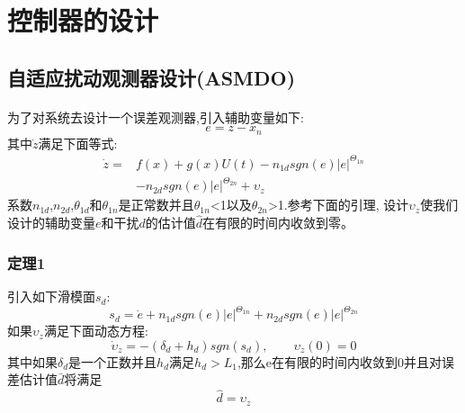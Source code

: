 \documentclass{cjc}
\begin{document}
\section{控制器的设计}

\subsection{自适应扰动观测器设计(ASMDO)}
  \paragraph{}为了对系统去设计一个误差观测器,引入辅助变量如下:
  \begin{equation}
    e = z - x_n  
  \end{equation}
  其中$\dot{z}$满足下面等式:
  \begin{eqnarray}
    \dot{z} = &f(x) + g(x)U(t) - n_{1d} sgn(e) \left|e \right|^{\varTheta_{1n}} \nonumber \\
    & -n_{2d} sgn(e)\left|e\right|^{\varTheta_{2n}} +\upsilon_z 
  \end{eqnarray}
  系数$n_{1d}$,$n_{2d}$,$\theta _{1d}$和$\theta _{1n}$是正常数并且$\theta _{1n}$<1以及$\theta _{2n}$>1.参考下面的引理,
  设计$\upsilon_z$使我们设计的辅助变量$e$和干扰$d$的估计值$\hat{d}$在有限的时间内收敛到零。

\subsubsection{定理1}
  引入如下滑模面$s_d$:
  \begin{equation}
    s_d = \dot{e} + n_{1d} sgn(e) \left| e \right|^{\varTheta_{1n}} + n_{2d} sgn(e)\left|e\right|^{\varTheta_{2n}} 
  \end{equation}
  如果$\upsilon_z$满足下面动态方程:
  \begin{equation}
    \dot{\upsilon}_z = -(\delta_d + h_d) sgn(s_d),\qquad \upsilon_z(0) = 0 
  \end{equation}
  其中如果$\delta_d$是一个正数并且$h_d$满足$h_d>L_1$,那么e在有限的时间内收敛到0并且对误差估计值$\bar{d}$将满足\:
  \begin{equation}
    \hat{d} = \upsilon_z
  \end{equation} 
  
\end{document}
